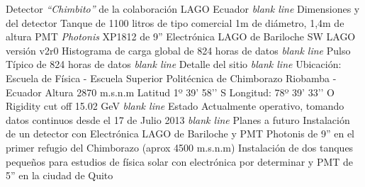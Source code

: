 \documentclass{article}
\begin{document}
Detector \emph{“Chimbito”} de la colaboración LAGO Ecuador \emph{blank line}
Dimensiones y  del detector
Tanque de 1100 litros de tipo comercial
1m de diámetro, 1,4m de altura	
PMT \emph{Photonis} XP1812 de 9”
Electrónica LAGO de Bariloche
SW LAGO versión v2r0
Histograma de carga global de 824 horas de datos \emph{blank line}
Pulso Típico de 824 horas de datos \emph{blank line}
Detalle del sitio \emph{blank line}
Ubicación: 	Escuela de Física - Escuela Superior Politécnica de Chimborazo
Riobamba - Ecuador
Altura		2870 m.s.n.m
Latitud		1º 39’ 58’’ S
Longitud:	78º 39’ 33’’ O
Rigidity cut off	15.02 GeV \emph{blank line}
Estado
Actualmente operativo, tomando datos continuos desde el 17 de Julio 2013 \emph{blank line}
Planes a futuro
Instalación de un detector con Electrónica LAGO de Bariloche y PMT Photonis de 9” en el primer refugio del Chimborazo (aprox 4500 m.s.n.m)
Instalación de dos tanques pequeños para estudios de física solar con electrónica por determinar y PMT de 5” en la ciudad de Quito
\end{document}
